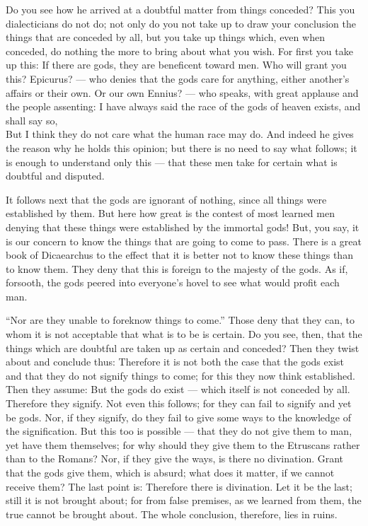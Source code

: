  Do you see how he arrived at a doubtful matter from things conceded? This you dialecticians do not do; not only do you not take up to draw your conclusion the things that are conceded by all, but you take up things which, even when conceded, do nothing the more to bring about what you wish. For first you take up this: If there are gods, they are beneficent toward men. Who will grant you this? Epicurus? — who denies that the gods care for anything, either another's affairs or their own. Or our own Ennius? — who speaks, with great applause and the people assenting:
I have always said the race of the gods of heaven exists, and shall say so, \\
But I think they do not care what the human race may do.
And indeed he gives the reason why he holds this opinion; but there is no need to say what follows; it is enough to understand only this — that these men take for certain what is doubtful and disputed.

 It follows next that the gods are ignorant of nothing, since all things were established by them. But here how great is the contest of most learned men denying that these things were established by the immortal gods! But, you say, it is our concern to know the things that are going to come to pass. There is a great book of Dicaearchus to the effect that it is better not to know these things than to know them. They deny that this is foreign to the majesty of the gods. As if, forsooth, the gods peered into everyone's hovel to see what would profit each man.

 ``Nor are they unable to foreknow things to come.'' Those deny that they can, to whom it is not acceptable that what is to be is certain. Do you see, then, that the things which are doubtful are taken up as certain and conceded? Then they twist about and conclude thus: Therefore it is not both the case that the gods exist and that they do not signify things to come; for this they now think established. Then they assume: But the gods do exist — which itself is not conceded by all. Therefore they signify. Not even this follows; for they can fail to signify and yet be gods. Nor, if they signify, do they fail to give some ways to the knowledge of the signification. But this too is possible — that they do not give them to man, yet have them themselves; for why should they give them to the Etruscans rather than to the Romans? Nor, if they give the ways, is there no divination. Grant that the gods give them, which is absurd; what does it matter, if we cannot receive them? The last point is: Therefore there is divination. Let it be the last; still it is not brought about; for from false premises, as we learned from them, the true cannot be brought about. The whole conclusion, therefore, lies in ruins.

